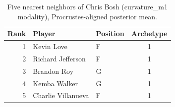 \begin{table}[htbp]
  \centering\small
  \begin{tabular}{rllc}
    \toprule
    Rank & Player & Position & Archetype \\
    \midrule
    1 & Kevin Love & F & 1 \\
    2 & Richard Jefferson & F & 1 \\
    3 & Brandon Roy & G & 1 \\
    4 & Kemba Walker & G & 1 \\
    5 & Charlie Villanueva & F & 1 \\
    \bottomrule
  \end{tabular}
  \caption{Five nearest neighbors of Chris Bosh (curvature_m1 modality), Procrustes-aligned posterior mean.}
  \label{tab:Chris_Bosh_neighbors_curvature_m1}
\end{table}

